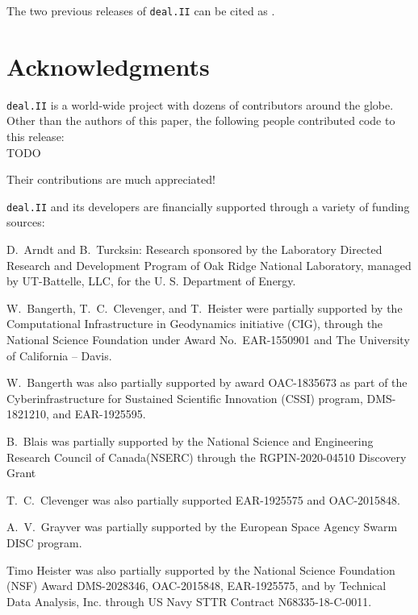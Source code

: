 \documentclass{ansarticle-preprint}
\newcommand{\specialword}[1]{\texttt{#1}}
\newcommand{\dealii}{{\specialword{deal.II}}\xspace}
\begin{document}
The two previous releases of \dealii{} can be cited as
\cite{dealII91,dealII92}.


\section{Acknowledgments}

\dealii{} is a world-wide project with dozens of contributors around the
globe. Other than the authors of this paper, the following people
contributed code to this release:\\
%
%
TODO

Their contributions are much appreciated!


\bigskip

\dealii{} and its developers are financially supported through a
variety of funding sources:

D.~Arndt and B.~Turcksin: Research sponsored by the Laboratory Directed Research and
Development Program of Oak Ridge National Laboratory, managed by UT-Battelle,
LLC, for the U. S. Department of Energy.

W.~Bangerth, T.~C.~Clevenger, and T.~Heister were partially
supported by the Computational Infrastructure
in Geodynamics initiative (CIG), through the National Science
Foundation under Award No.~EAR-1550901 and The
University of California -- Davis.


W.~Bangerth was also partially supported by award OAC-1835673 as part of the Cyberinfrastructure for Sustained Scientific Innovation (CSSI)
program, DMS-1821210,
and EAR-1925595.


B.~Blais was partially supported by the National Science and Engineering Research Council of Canada(NSERC)  through the RGPIN-2020-04510 Discovery Grant

T.~C.~Clevenger was also partially supported EAR-1925575 and OAC-2015848.

A.~V.~Grayver was partially supported by the European Space Agency
Swarm DISC program.

Timo Heister was also partially supported by the National Science Foundation (NSF)
Award DMS-2028346, OAC-2015848, EAR-1925575, and by
Technical Data Analysis, Inc. through US Navy STTR Contract N68335-18-C-0011.
\end{document}
